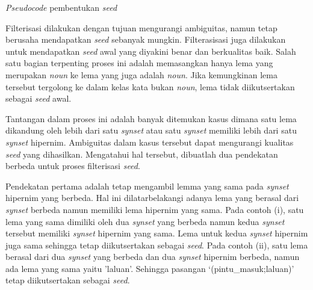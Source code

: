 \begin{kode}\label{(seed_builder)}
  
  \label{code:seedbuilder}  
  \caption{\textit{Pseudocode} pembentukan \textit{seed}}  
\end{kode}

Filterisasi dilakukan dengan tujuan mengurangi ambiguitas, namun tetap berusaha mendapatkan \textit{seed} sebanyak mungkin. Filterasisasi juga dilakukan untuk mendapatkan \textit{seed} awal yang diyakini benar dan berkualitas baik. Salah satu bagian terpenting proses ini adalah memasangkan hanya lema yang merupakan \textit{noun} ke lema yang juga adalah \textit{noun}. Jika kemungkinan lema tersebut tergolong ke dalam kelas kata bukan \textit{noun}, lema tidak diikutsertakan sebagai \textit{seed} awal.

Tantangan dalam proses ini adalah banyak ditemukan kasus dimana satu lema dikandung oleh lebih dari satu \textit{synset} atau satu \textit{synset} memiliki lebih dari satu \textit{synset} hipernim. Ambiguitas dalam kasus tersebut dapat mengurangi kualitas \textit{seed} yang dihasilkan. Mengatahui hal tersebut, dibuatlah dua pendekatan berbeda untuk proses filterisasi \textit{seed}.

Pendekatan pertama adalah tetap mengambil lemma yang sama pada \textit{synset} hipernim yang berbeda. Hal ini dilatarbelakangi adanya lema yang berasal dari \textit{synset} berbeda namun memiliki lema hipernim yang sama. Pada contoh (i), satu lema yang sama dimiliki oleh dua \textit{synset} yang berbeda namun kedua \textit{synset} tersebut memiliki \textit{synset} hipernim yang sama. Lema untuk kedua \textit{synset} hipernim juga sama sehingga tetap diikutsertakan sebagai \textit{seed}. Pada contoh (ii), satu lema berasal dari dua \textit{synset} yang berbeda dan dua \textit{synset} hipernim berbeda, namun ada lema yang sama yaitu 'laluan'. Sehingga pasangan `(pintu\_masuk;laluan)' tetap diikutsertakan sebagai \textit{seed}.

